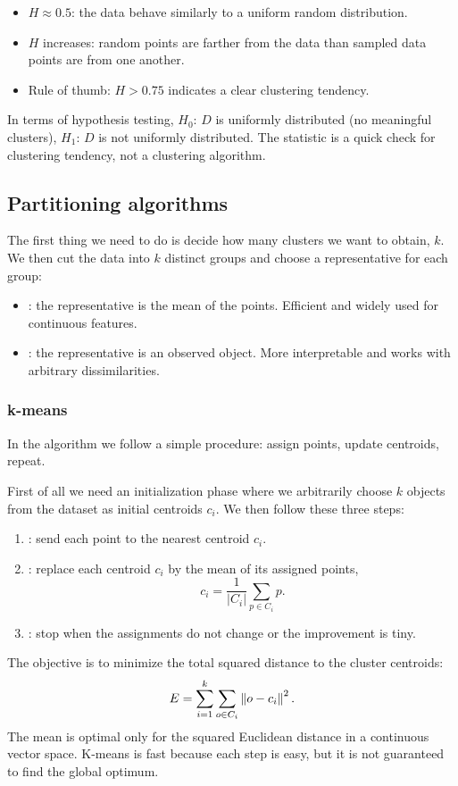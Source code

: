 \begin{itemize}
  \item $H \approx 0.5$: the data behave similarly to a uniform random distribution.
  \item $H$ increases: random points are farther from the data than sampled data points are from one another.
  \item Rule of thumb: $H > 0.75$ indicates a clear clustering tendency.
\end{itemize}
In terms of hypothesis testing, $H_0$: $D$ is uniformly distributed (no meaningful clusters), $H_1$: $D$ is not uniformly distributed. The statistic is a quick check for clustering tendency, not a clustering algorithm.

\subsection{Partitioning algorithms}

The first thing we need to do is decide how many clusters we want to obtain, $k$. We then cut the data into $k$ distinct groups and choose a representative for each group:
\begin{itemize}
  \item {}: the representative is the mean of the points. Efficient and widely used for continuous features.
  \item {}: the representative is an observed object. More interpretable and works with arbitrary dissimilarities.
\end{itemize}

\subsubsection{k-means}

In the  algorithm we follow a simple procedure: assign points, update centroids, repeat.

First of all we need an initialization phase where we arbitrarily choose $k$ objects from the dataset as initial centroids $c_i$. We then follow these three steps:
\begin{enumerate}
  \item {}: send each point to the nearest centroid $c_i$.
  \item {}: replace each centroid $c_i$ by the mean of its assigned points,
  \[
    c_i = \frac{1}{|C_i|} \sum_{p \in C_i} p.
  \]
  \item {}: stop when the assignments do not change or the improvement is tiny.
\end{enumerate}
The objective is to minimize the total squared distance to the cluster centroids:
\[
  E = \sum_{i=1}^{k} \sum_{o \in C_i} \left\lVert o - c_i \right\rVert^2.
\]
The mean is optimal only for the squared Euclidean distance in a continuous vector space. K-means is fast because each step is easy, but it is not guaranteed to find the global optimum.

